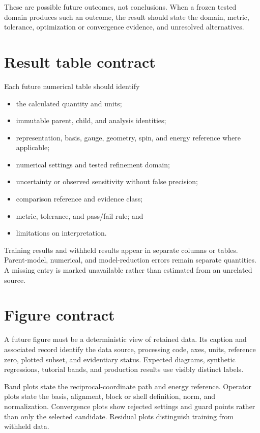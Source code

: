 These are possible future outcomes, not conclusions. When a frozen tested domain
produces such an outcome, the result should state the domain, metric, tolerance,
optimization or convergence evidence, and unresolved alternatives.

\section{Result table contract}


Each future numerical table should identify

\begin{itemize}
  \item the calculated quantity and units;
  \item immutable parent, child, and analysis identities;
  \item representation, basis, gauge, geometry, spin, and energy reference where
    applicable;
  \item numerical settings and tested refinement domain;
  \item uncertainty or observed sensitivity without false precision;
  \item comparison reference and evidence class;
  \item metric, tolerance, and pass/fail rule; and
  \item limitations on interpretation.
\end{itemize}

Training results and withheld results appear in separate columns or tables.
Parent-model, numerical, and model-reduction errors remain separate quantities.
A missing entry is marked unavailable rather than estimated from an unrelated
source.

\section{Figure contract}


A future figure must be a deterministic view of retained data. Its caption and
associated record identify the data source, processing code, axes, units,
reference zero, plotted subset, and evidentiary status. Expected diagrams,
synthetic regressions, tutorial bands, and production results use visibly
distinct labels.

Band plots state the reciprocal-coordinate path and energy reference. Operator
plots state the basis, alignment, block or shell definition, norm, and
normalization. Convergence plots show rejected settings and guard points rather
than only the selected candidate. Residual plots distinguish training from
withheld data.

